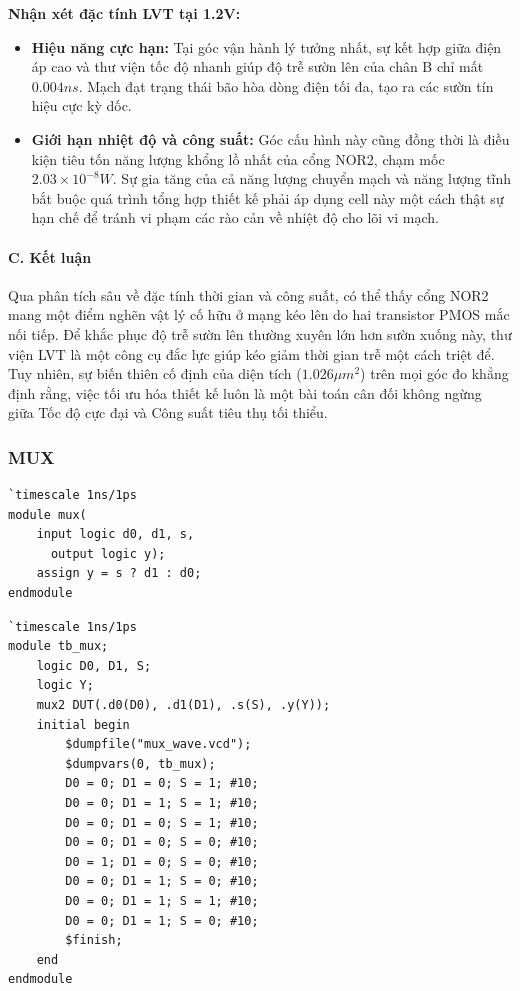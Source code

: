 \documentclass[12pt, a4paper, oneside]{article}
\begin{document}
\textbf{Nhận xét đặc tính LVT tại 1.2V:}
\begin{itemize}
    \item \textbf{Hiệu năng cực hạn:} Tại góc vận hành lý tưởng nhất, sự kết hợp giữa điện áp cao và thư viện tốc độ nhanh giúp độ trễ sườn lên của chân B chỉ mất $0.004ns$. Mạch đạt trạng thái bão hòa dòng điện tối đa, tạo ra các sườn tín hiệu cực kỳ dốc.
    \item \textbf{Giới hạn nhiệt độ và công suất:} Góc cấu hình này cũng đồng thời là điều kiện tiêu tốn năng lượng khổng lồ nhất của cổng NOR2, chạm mốc $2.03 \times 10^{-8}W$. Sự gia tăng của cả năng lượng chuyển mạch và năng lượng tĩnh bắt buộc quá trình tổng hợp thiết kế phải áp dụng cell này một cách thật sự hạn chế để tránh vi phạm các rào cản về nhiệt độ cho lõi vi mạch.
\end{itemize}

\paragraph{C. Kết luận} 
Qua phân tích sâu về đặc tính thời gian và công suất, có thể thấy cổng NOR2 mang một điểm nghẽn vật lý cố hữu ở mạng kéo lên do hai transistor PMOS mắc nối tiếp. Để khắc phục độ trễ sườn lên thường xuyên lớn hơn sườn xuống này, thư viện LVT là một công cụ đắc lực giúp kéo giảm thời gian trễ một cách triệt để. Tuy nhiên, sự biến thiên cố định của diện tích ($1.026 \mu m^2$) trên mọi góc đo khẳng định rằng, việc tối ưu hóa thiết kế luôn là một bài toán cân đối không ngừng giữa Tốc độ cực đại và Công suất tiêu thụ tối thiểu.

\newpage
\subsubsection{MUX}
\begin{lstlisting}[style={prettyverilog}, caption={\texttt{code thiết kế MUX}}]
`timescale 1ns/1ps
module mux(
    input logic d0, d1, s,
      output logic y);
    assign y = s ? d1 : d0;
endmodule
\end{lstlisting}
\begin{lstlisting}[style={prettyverilog}, caption={\texttt{code testbench MUX}}]
`timescale 1ns/1ps
module tb_mux;
    logic D0, D1, S;
    logic Y;
    mux2 DUT(.d0(D0), .d1(D1), .s(S), .y(Y));
    initial begin
        $dumpfile("mux_wave.vcd");
        $dumpvars(0, tb_mux);
        D0 = 0; D1 = 0; S = 1; #10;
        D0 = 0; D1 = 1; S = 1; #10;
        D0 = 0; D1 = 0; S = 1; #10;
        D0 = 0; D1 = 0; S = 0; #10;
        D0 = 1; D1 = 0; S = 0; #10;
        D0 = 0; D1 = 1; S = 0; #10;
        D0 = 0; D1 = 1; S = 1; #10;
        D0 = 0; D1 = 1; S = 0; #10;
        $finish;
    end
endmodule
\end{lstlisting}
\end{document}
